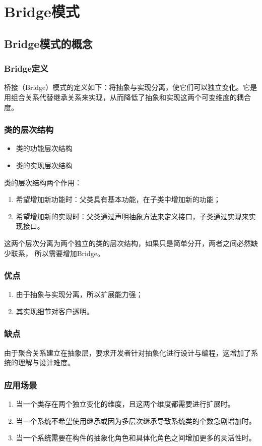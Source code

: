 \chapter{Bridge模式}
\section{Bridge模式的概念}
\subsection{Bridge定义}
桥接（Bridge）模式的定义如下：将抽象与实现分离，使它们可以独立变化。它是用组合关系代替继承关系来实现，从而降低了抽象和实现这两个可变维度的耦合度。
\subsection{类的层次结构}
\begin{itemize}
	\item 类的功能层次结构
	\item 类的实现层次结构
\end{itemize}
类的层次结构两个作用：
\begin{enumerate}
	\item 希望增加新功能时：父类具有基本功能，在子类中增加新的功能；
	\item 希望增加新的实现时：父类通过声明抽象方法来定义接口，子类通过实现来实现接口。
\end{enumerate}
这两个层次分离为两个独立的类的层次结构，如果只是简单分开，两者之间必然缺少联系，
所以需要增加Bridge。
\subsection{优点}
\begin{enumerate}
	\item 由于抽象与实现分离，所以扩展能力强；
	\item 其实现细节对客户透明。
\end{enumerate}
\subsection{缺点}
由于聚合关系建立在抽象层，要求开发者针对抽象化进行设计与编程，这增加了系统的理解与设计难度。
\subsection{应用场景}
\begin{enumerate}
	\item 当一个类存在两个独立变化的维度，且这两个维度都需要进行扩展时。
	\item 当一个系统不希望使用继承或因为多层次继承导致系统类的个数急剧增加时。
	\item 当一个系统需要在构件的抽象化角色和具体化角色之间增加更多的灵活性时。
\end{enumerate}
